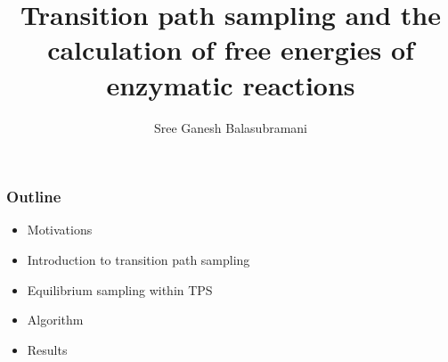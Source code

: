 \documentclass{beamer}
\title[TPS free energies]{Transition path sampling and the calculation of free energies of enzymatic reactions}
\author[Schwartz Group]{Sree Ganesh Balasubramani}
\institute[U of A]{Schwartz Group \\ Chemistry and Biochemistry } %
\date{}
\begin{document}
\begin{frame}
  \titlepage
\end{frame}
\begin{frame}
  \frametitle{Outline}
  \begin{itemize}[<+-|alert@+>]
      \item Motivations
      \item Introduction to transition path sampling 
      \item Equilibrium sampling within TPS
      \item Algorithm 
      \item Results
  \end{itemize}
\end{frame}
\end{document}
